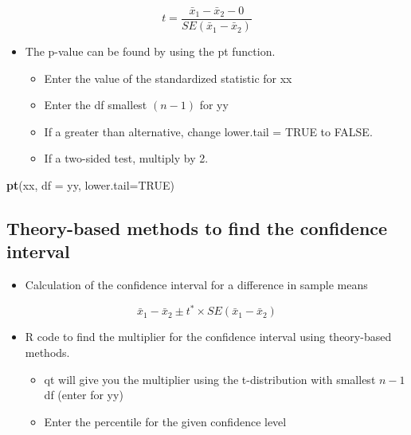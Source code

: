 \documentclass[
]{report}
\newenvironment{Shaded}{\begin{snugshade}}{\end{snugshade}}
\newcommand{\AttributeTok}[1]{\textcolor[rgb]{0.13,0.29,0.53}{#1}}
\newcommand{\ConstantTok}[1]{\textcolor[rgb]{0.56,0.35,0.01}{#1}}
\newcommand{\FunctionTok}[1]{\textcolor[rgb]{0.13,0.29,0.53}{\textbf{#1}}}
\newcommand{\NormalTok}[1]{#1}
\providecommand{\tightlist}{%
  \setlength{\itemsep}{0pt}\setlength{\parskip}{0pt}}
\begin{document}
\[t = \frac{\bar{x}_1-\bar{x}_2-0}{SE(\bar{x}_1 - \bar{x}_2)}\]

\begin{itemize}
\item
  The p-value can be found by using the pt function.

  \begin{itemize}
  \item
    Enter the value of the standardized statistic for xx
  \item
    Enter the df smallest \((n-1)\) for yy
  \item
    If a greater than alternative, change lower.tail = TRUE to FALSE.
  \item
    If a two-sided test, multiply by 2.
  \end{itemize}
\end{itemize}

\begin{Shaded}
\begin{Highlighting}[]
\FunctionTok{pt}\NormalTok{(xx, }\AttributeTok{df =}\NormalTok{ yy, }\AttributeTok{lower.tail=}\ConstantTok{TRUE}\NormalTok{)}
\end{Highlighting}
\end{Shaded}

\subsection*{Theory-based methods to find the confidence interval}\label{theory-based-methods-to-find-the-confidence-interval}

\begin{itemize}
\tightlist
\item
  Calculation of the confidence interval for a difference in sample means
\end{itemize}

\[\bar{x}_1-\bar{x}_2\pm t^*\times SE(\bar{x}_1-\bar{x}_2)\]

\begin{itemize}
\item
  R code to find the multiplier for the confidence interval using theory-based methods.

  \begin{itemize}
  \item
    qt will give you the multiplier using the t-distribution with smallest \(n-1\) df (enter for yy)
  \item
    Enter the percentile for the given confidence level
  \end{itemize}
\end{itemize}
\end{document}
